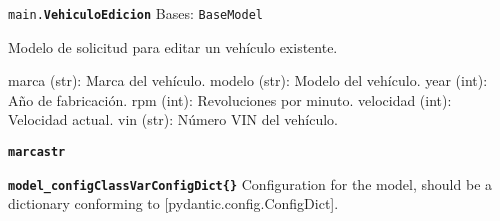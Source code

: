 \documentclass[a4paper,11pt,spanish]{sphinxmanual}
\newcommand{\robotoMonoBold}{\fontseries{b}\selectfont\ttfamily}
\renewcommand{\sphinxcode}[1]{\textcolor{sphinxorangeCode}{{\robotoMonoBold #1}}}
\renewcommand{\sphinxbfcode}[1]{\textbf{\sphinxcode{#1}}}
\renewcommand{\sphinxupquote}[1]{\texttt{#1}}
\begin{document}
\begin{fulllineitems}
\label{\detokenize{modelos:main.VehiculoEdicion}}
\pysigstartsignatures
\pysiglinewithargsret
{\sphinxbfcode{\sphinxupquote{}}\sphinxcode{\sphinxupquote{main.}}\sphinxbfcode{\sphinxupquote{VehiculoEdicion}}}
{\sphinxparamcomma {}\sphinxparamcomma {}\sphinxparamcomma {}\sphinxparamcomma {}\sphinxparamcomma {}\sphinxparamcomma {}}
{}
\pysigstopsignatures
\sphinxAtStartPar
Bases: \sphinxcode{\sphinxupquote{BaseModel}}

\sphinxAtStartPar
Modelo de solicitud para editar un vehículo existente.
\begin{description}
\sphinxAtStartPar
marca (str): Marca del vehículo.
modelo (str): Modelo del vehículo.
year (int): Año de fabricación.
rpm (int): Revoluciones por minuto.
velocidad (int): Velocidad actual.
vin (str): Número VIN del vehículo.

\end{description}

\begin{fulllineitems}
\label{\detokenize{modelos:main.VehiculoEdicion.marca}}
\pysigstartsignatures
\pysigline
{\sphinxbfcode{\sphinxupquote{marca}}\sphinxbfcode{\sphinxupquote{str}}}
\pysigstopsignatures
\end{fulllineitems}


\begin{fulllineitems}
\label{\detokenize{modelos:main.VehiculoEdicion.model_config}}
\pysigstartsignatures
\pysigline
{\sphinxbfcode{\sphinxupquote{model\_config}}\sphinxbfcode{\sphinxupquote{ClassVar\DUrole{p}{{[}}ConfigDict\DUrole{p}{{]}}}}\sphinxbfcode{\sphinxupquote{\DUrole{w}{ }\{\}}}}
\pysigstopsignatures
\sphinxAtStartPar
Configuration for the model, should be a dictionary conforming to {[}\sphinxtitleref{ConfigDict}{]}{[}pydantic.config.ConfigDict{]}.


\end{fulllineitems}
\end{fulllineitems}
\end{document}

